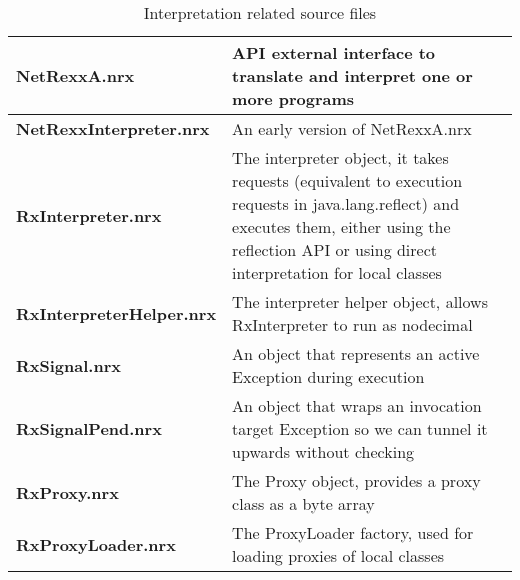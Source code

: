 \begin{table}\caption{Interpretation related source files}
\begin{tabularx}{\textwidth}{>{\bfseries}lX}
    \toprule
    NetRexxA.nrx        &\nr{} API external interface to translate and interpret one or more \nr{} programs
    \\\midrule
    NetRexxInterpreter.nrx &An early version of NetRexxA.nrx
    \\\midrule
    RxInterpreter.nrx   &The interpreter object, it takes requests (equivalent to execution requests in java.lang.reflect) and executes them, either using the reflection API or using direct interpretation for local classes
    \\\midrule
    RxInterpreterHelper.nrx   &The interpreter helper object, allows RxInterpreter to run as nodecimal
    \\\midrule
    RxSignal.nrx        &An object that represents an active Exception during execution
    \\\midrule
    RxSignalPend.nrx    &An object that wraps an invocation target Exception so we can tunnel it
    upwards without checking
    \\\midrule
    RxProxy.nrx         &The Proxy object, provides a proxy class as a byte array
    \\\midrule
    RxProxyLoader.nrx   &The ProxyLoader factory, used for loading proxies of local classes
    \\\bottomrule
\end{tabularx}
\end{table}



